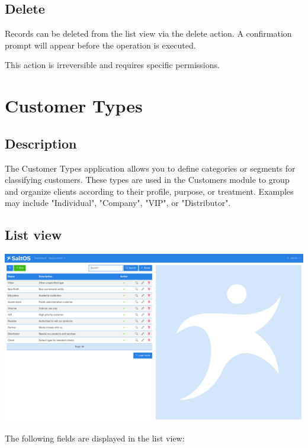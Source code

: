 \documentclass[a4paper]{article}
\begin{document}
\hypertarget{toc50}{}
\subsection{Delete}

Records can be deleted from the list view via the delete action.
A confirmation prompt will appear before the operation is executed.

This action is irreversible and requires specific permissions.


\hypertarget{toc51}{}
\section{Customer Types}

\hypertarget{toc52}{}
\subsection{Description}

The Customer Types application allows you to define categories or segments for classifying customers.
These types are used in the Customers module to group and organize clients according to their profile, purpose, or treatment.
Examples may include "Individual", "Company", "VIP", or "Distributor".

\hypertarget{toc53}{}
\subsection{List view}

\begin{center}\includegraphics[width=1\textwidth]{../ujest/snaps/test-screenshots-js-screenshots-crm-customers-types-list-en-us-1-snap.png}\end{center}

The following fields are displayed in the list view:
\end{document}
